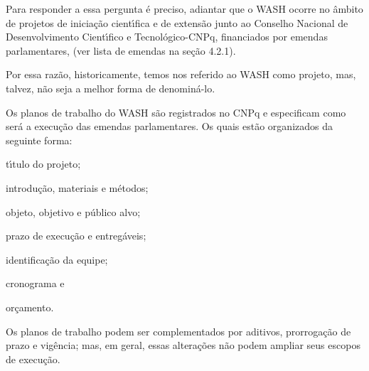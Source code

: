 \documentclass[
12pt,		%
openright,	%
twoside,  %
a4paper,			%
chapter=TITLE,		%
english,			%
french,				%
spanish,			%
brazil				%
]{USPSC-classe/USPSC}
\begin{document}
Para responder a essa pergunta \'e preciso, adiantar que o WASH ocorre no \^ambito de projetos de inicia\c{c}\~ao cient\'{\i}fica e de extens\~ao junto ao Conselho Nacional de Desenvolvimento Cient\'{\i}fico e Tecnol\'ogico-CNPq, financiados por emendas parlamentares, (ver  lista de emendas na se\c{c}\~ao 4.2.1).

















Por essa raz\~ao, historicamente, temos nos referido ao WASH como projeto, mas, talvez, n\~ao seja a melhor forma de denomin\'a-lo.

















Os planos de trabalho do WASH s\~ao registrados no CNPq e especificam como ser\'a a execu\c{c}\~ao das emendas parlamentares. Os quais est\~ao organizados da seguinte forma:


















\begin{alineas}
\item t\'{\i}tulo do projeto;
\item introdu\c{c}\~ao, materiais e m\'etodos;
\item objeto, objetivo e p\'ublico alvo;
\item prazo de execu\c{c}\~ao e entreg\'aveis;
\item identifica\c{c}\~ao da equipe;
\item cronograma e
\item or\c{c}amento.
\end{alineas}

Os planos de trabalho podem ser complementados por aditivos, prorroga\c{c}\~ao de prazo e vig\^encia; mas, em geral, essas altera\c{c}\~oes n\~ao podem ampliar seus escopos de execu\c{c}\~ao.
\end{document}
